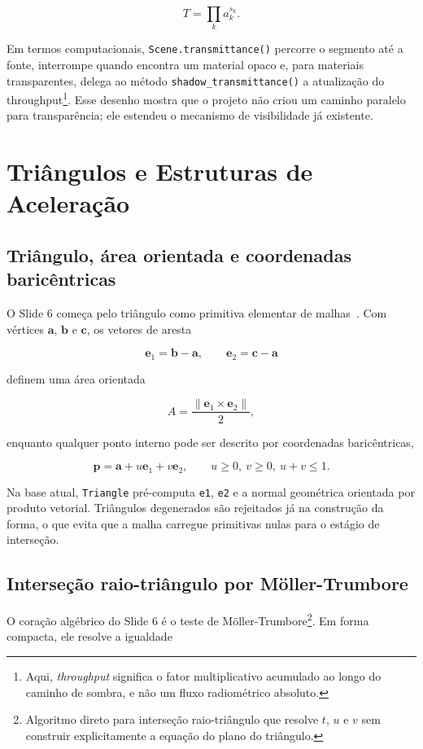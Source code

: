 \documentclass[portuguese]{sbcreviews-2025}%
\makeatletter
\newcommand{\slideurl}[1]{%
    \ifcsname slideurl@#1\endcsname
        \csname slideurl@#1\endcsname
    \else
        #1
    \fi
}
\newcommand{\slidescite}[2]{\citep[\href{\slideurl{#1}}{pp.~#2}]{#1}}
\makeatother
\begin{document}
\[
T = \prod_k a_k^{s_k}.
\]

Em termos computacionais, \texttt{Scene.transmittance()} percorre o segmento até a fonte, interrompe quando encontra um material opaco e, para materiais transparentes, delega ao método \texttt{shadow\_transmittance()} a atualização do throughput\footnote{Aqui, \emph{throughput} significa o fator multiplicativo acumulado ao longo do caminho de sombra, e não um fluxo radiométrico absoluto.}. Esse desenho mostra que o projeto não criou um caminho paralelo para transparência; ele estendeu o mecanismo de visibilidade já existente.

\section{Triângulos e Estruturas de Aceleração}
\label{sec:triangulos-v3}

\subsection{Triângulo, área orientada e coordenadas baricêntricas}
\label{sec:tri-bar-v3}

O Slide 6 começa pelo triângulo como primitiva elementar de malhas~\slidescite{inf2608slides06}{3--4}. Com vértices \(\mathbf{a}\), \(\mathbf{b}\) e \(\mathbf{c}\), os vetores de aresta

\[
\mathbf{e}_1 = \mathbf{b}-\mathbf{a},
\qquad
\mathbf{e}_2 = \mathbf{c}-\mathbf{a}
\]

definem uma área orientada

\[
A = \frac{\lVert \mathbf{e}_1 \times \mathbf{e}_2 \rVert}{2},
\]

enquanto qualquer ponto interno pode ser descrito por coordenadas baricêntricas,

\[
\mathbf{p}=\mathbf{a}+u\mathbf{e}_1+v\mathbf{e}_2,
\qquad
u\ge 0,\ v\ge 0,\ u+v\le 1.
\]

Na base atual, \texttt{Triangle} pré-computa \texttt{e1}, \texttt{e2} e a normal geométrica orientada por produto vetorial. Triângulos degenerados são rejeitados já na construção da forma, o que evita que a malha carregue primitivas nulas para o estágio de interseção.

\subsection{Interseção raio-triângulo por Möller-Trumbore}
\label{sec:moller-v3}

O coração algébrico do Slide 6 é o teste de Möller-Trumbore\footnote{Algoritmo direto para interseção raio-triângulo que resolve \(t\), \(u\) e \(v\) sem construir explicitamente a equação do plano do triângulo.}. Em forma compacta, ele resolve a igualdade
\end{document}
